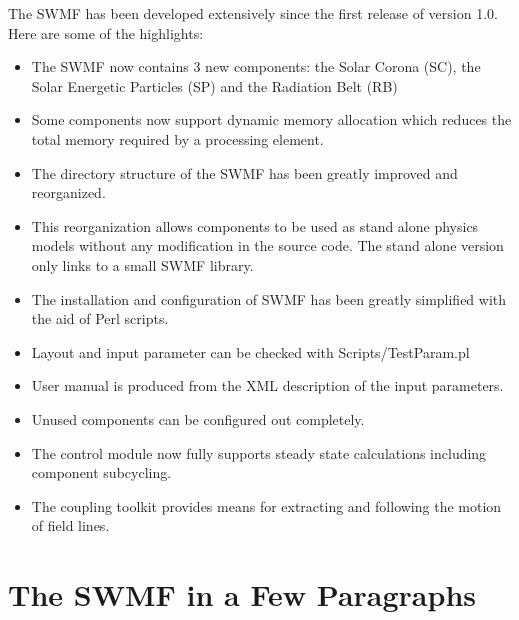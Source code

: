 The SWMF has been developed extensively since the first release of
version 1.0. Here are some of the highlights:
\begin{itemize}
\item The SWMF now contains 3 new components:
      the Solar Corona (SC), the Solar Energetic Particles (SP) 
      and the Radiation Belt (RB)
\item Some components now support dynamic memory allocation which 
      reduces the total memory required by a processing element. 
\item The directory structure of the SWMF has been greatly improved and 
      reorganized. 
\item This reorganization allows components to be used as stand alone 
      physics models without any modification in the source code.  The
      stand alone version only links to a small SWMF library.
\item The installation and configuration of SWMF has been greatly simplified
      with the aid of Perl scripts. 
\item Layout and input parameter can be checked with Scripts/TestParam.pl
\item User manual is produced from the XML description of the input parameters.
\item Unused components can be configured out completely.
\item The control module now fully supports steady state calculations 
      including component subcycling. 
\item The coupling toolkit provides means for extracting and following 
      the motion of field lines.
\end{itemize}

\section{The SWMF in a Few Paragraphs}


